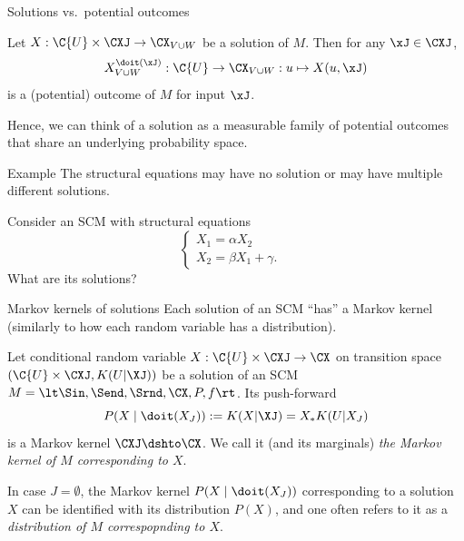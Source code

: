 \begin{frame}{Solutions vs.\ potential outcomes}
\begin{Rem}
  Let $X : \C{U} \times \CXJ \to \CX_{V\cup W}$ be a solution of $M$. 
  Then for any $\xJ \in \CXJ$, 
  $$X^{\doit(\xJ)}_{V\cup W} : \C{U} \to \CX_{V\cup W} : u \mapsto X(u,\xJ)$$ 
  is a (potential) outcome of $M$ for input $\xJ$.
\end{Rem}
Hence, we can think of a solution as a measurable family of potential outcomes that share an underlying probability space.
\end{frame}

\begin{frame}[t]{Example}
The structural equations  may have no solution or may have multiple different solutions.
\begin{Eg}
Consider an SCM with structural equations
$$\begin{cases}
  X_1 = \alpha X_2 & \\
  X_2 = \beta X_1 + \gamma. &
\end{cases}$$
What are its solutions?
\end{Eg}
\end{frame}

\begin{frame}{Markov kernels of solutions}
Each solution of an SCM ``has'' a Markov kernel (similarly to how each random variable has a distribution).
\begin{Not}\label{def:scm_kernels}
  Let conditional random variable $X : \C{U} \times \CXJ \to \CX$ on transition space $(\C{U} \times \CXJ, K(U|\XJ))$ be a solution of an SCM
  $M = \lt \Sin, \Send, \Srnd, \CX, P, f \rt$.
  Its push-forward 
  $$P(X \mid \doit(X_J)) := K(X|\XJ) = X_* K(U|X_J)$$
  is a Markov kernel $\CXJ \dshto \CX$.
  We call it (and its marginals) \emph{the Markov kernel of $M$ corresponding to $X$}.
\end{Not}

\begin{Rem}
In case $J = \emptyset$, the Markov kernel $P(X \mid \doit(X_J))$ corresponding to a solution $X$ can be identified with its distribution $P(X)$, and one often refers to it as a \emph{distribution of $M$ correspopnding to $X$}.
\end{Rem}
\end{frame}

